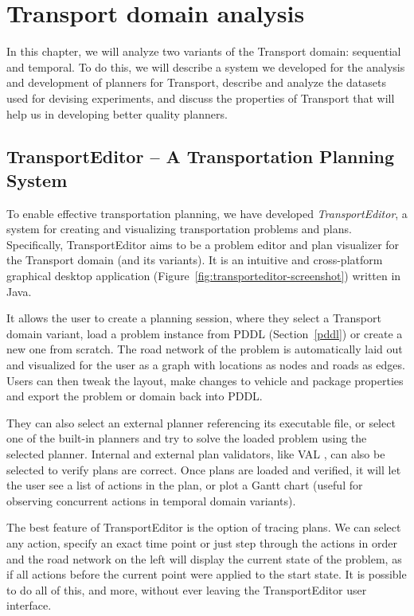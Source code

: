 \chapter{Transport domain analysis}

In this chapter, we will analyze two variants of the Transport domain: sequential and temporal. To do this, we will describe a system we developed for the analysis
and development of planners for Transport, describe and analyze the datasets
used for devising experiments, and discuss the properties of Transport
that will help us in developing better quality planners.

\section{TransportEditor -- A Transportation Planning System}

To enable effective transportation planning,
we have developed \textit{TransportEditor}, a system for creating and visualizing transportation problems and plans.
Specifically, TransportEditor aims to be a problem editor and plan visualizer for the Transport domain (and its variants). It is an intuitive and cross-platform graphical desktop application (Figure~\ref{fig:transporteditor-screenshot})
written in Java.

It allows the user to create a planning session, where they
select a Transport domain variant, load a problem instance from PDDL (Section~\ref{pddl}) or create a new one from scratch.
The road network of the problem is automatically laid out and visualized for the user as a graph with locations as nodes and roads as edges.
Users can then tweak the layout, make changes to vehicle and package properties
and export the problem or domain back into PDDL.

They can also select an external planner
referencing its executable file, or select one of the built-in planners and try to solve
the loaded problem using the selected planner. Internal and external plan validators, like VAL \citep{Howey2003}, can also be selected to verify plans are correct.
Once plans are loaded and verified, it will let the user see a list of actions
in the plan, or plot a Gantt chart (useful for observing concurrent actions in temporal domain variants).

The best feature of TransportEditor is the option of tracing plans. We can select
any action, specify an exact time point or just step through the actions in order and
the road network on the left will display the current state of the problem, as if
all actions before the current point were applied to the start state.
It is possible to do all of this, and more, without ever leaving the TransportEditor user interface.

